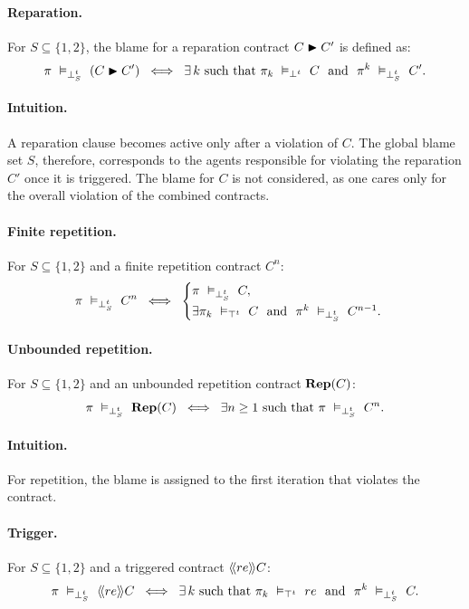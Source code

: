 \paragraph{Reparation.}
For \(S\subseteq\{1,2\}\), the blame for a reparation contract \(C\repair C'\) is defined as:
\[
\pi\ \vDash_{\bottp{S}}\ (C\repair C')
\;\iff\;
\exists\,k\ \text{such that}\ 
\pi_k\ \vDash_{\bott}\ C
\ \nd\
\pi^k\ \vDash_{\bottp{S}}\ C'.
\]
\paragraph{Intuition.}  A reparation clause becomes active only after a violation of \(C\). The global blame set \(S\), therefore, corresponds to the agents responsible for violating the reparation \(C'\) once it is triggered. The blame for $C$ is not considered, as one cares only for the overall violation of the combined contracts.

\paragraph{Finite repetition.}
For $S\subseteq\{1,2\}$ and a finite repetition contract $C^n$:
\[
\pi\ \vDash_{\bottp{S}}\ C^n \;\iff\;
\begin{cases}
\pi\ \vDash_{\bottp{S}}\ C,\\[2pt]
\exists \pi_k\ \vDash_{\topt} \ C \ \nd\ \pi^{k}\ \vDash_{\bottp{S}}\ C^{n-1}.
\end{cases}
\]

\paragraph{Unbounded repetition.}
For $S\subseteq\{1,2\}$ and an unbounded repetition contract $\repit{C}$:
\[
\pi\ \vDash_{\bottp{S}}\ \repit{C} \;\iff\; \exists n \ge 1 \text{ such that } \pi\ \vDash_{\bottp{S}}\ C^n.
\]
\paragraph{Intuition.} For repetition, the blame is assigned to the first iteration that violates the contract.

\paragraph{Trigger.}
For $S\subseteq\{1,2\}$ and a triggered contract $\trig[re]{C}$:
\[
\pi\ \vDash_{\bottp{S}}\ \trig[re]{C} \;\iff\;
\exists\,k \text{ such that } \pi_k\ \vDash_{\topt}\ re \ \nd\ \pi^{k}\ \vDash_{\bottp{S}}\ C.
\]

